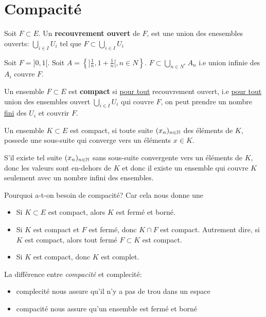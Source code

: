 \section{Compacité}
\begin{definition}
    Soit $F \subset E$. Un \textbf{recouvrement ouvert} de $F$, est une union des enesembles ouverts:  $\bigcup_{i \in I} U_i$ tel que $F \subset \bigcup_{i \in I} U_i$
\end{definition}
\begin{eg}
    Soit $F = ]0, 1[$. Soit $A = \left\{]\frac{1}{n}, 1 + \frac{1}{n}[, n \in N\right\}$. $F \subset \bigcup_{n \in N^{*}} A_n$ i.e union infinie des $A_i$ couvre $F$.
\end{eg}
\begin{definition}
    Un ensemble $F \subset E$ est \textbf{compact} si \underline{pour tout} recouvrement ouvert, i.e \underline{pour tout} union des ensembles ouvert $\bigcup_{i \in I} U_i$ qui couvre $F$, on peut prendre un nombre \underline{fini} des  $U_i$ et couvrir $F$.
\end{definition}
\begin{theorem}
    Un ensemble $K \subset E$ est compact, si toute suite $(x_n)_{n \in \mathbb{N}}$ des éléments de $K$, possede une sous-suite qui converge  vers un éléments $x \in K$.
\end{theorem}
\begin{intuition}
    S'il existe tel suite $(x_n)_{n \in \mathbb{N}}$ sans sous-suite convergente vers un éléments de  $K$, donc les valeurs sont en-dehors de  $K$ et donc il existe un ensemble qui couvre $K$  seulement avec un nombre infini des ensembles. 
\end{intuition}
Pourquoi a-t-on besoin de compacité? Car cela nous donne une
\begin{prop}
    \begin{itemize}
        \item Si $K \subset E$ est compact, alors $K$ est fermé et borné.
        \item Si $K$ est compact et  $F$ est fermé, donc  $K \cap F$ est compact. Autrement dire, si $K$ est compact, alors tout fermé $F \subset K$ est compact.
        \item Si $K$ est compact, donc  $K$ est complet.
    \end{itemize}
\end{prop}
\begin{property}
    La différence entre \textit{compacité} et {complecité}:
    \begin{itemize}
        \item complecité nous assure qu'il n'y a pas de trou dans un espace
        \item compacité nous assure qu'un ensemble est fermé et borné
    \end{itemize}
\end{property}
